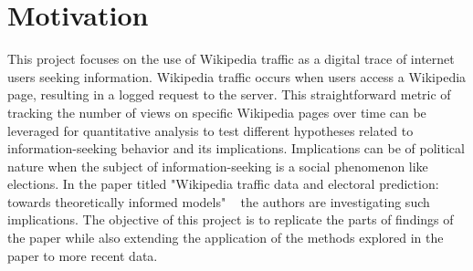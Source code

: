 \chapter{Motivation}
\label{sec:motivation}

This project focuses on the use of Wikipedia traffic as a digital trace of internet users seeking information. Wikipedia traffic occurs when users access a Wikipedia page, resulting in a logged request to the server. This straightforward metric of tracking the number of views on specific Wikipedia pages over time can be leveraged for quantitative analysis to test different hypotheses related to information-seeking behavior and its implications. Implications can be of political nature when the subject of information-seeking is a social phenomenon like elections. In the paper titled "Wikipedia traffic data and electoral prediction: towards theoretically informed models" ~\cite{Yasseri2016Dec} the authors are investigating such implications. The objective of this project is to replicate the parts of findings of the paper while also extending the application of the methods explored in the paper to more recent data. \par 

